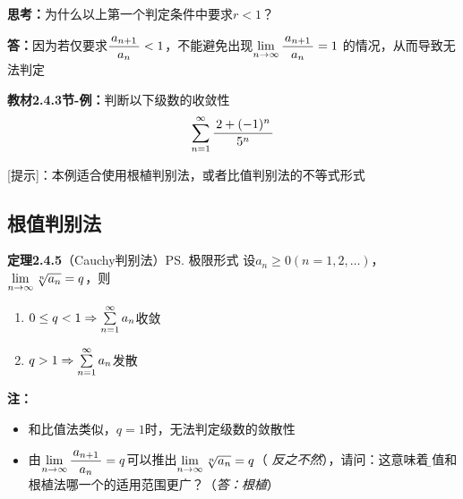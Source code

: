 {\b {\bf 思考：}为什么以上第一个判定条件中要求$r<1$？

{\bf 答：}因为若仅要求$\displaystyle\frac{\,{a_{n+1}}\,}{\,{a_n}\,}<1$，不能避免出现$\lim\limits_{n\to\infty}\displaystyle\frac{\,{a_{n+1}}\,}{\,{a_n}\,}=1$
的情况，从而导致无法判定}

{\bf 教材2.4.3节-例：}判断以下级数的收敛性
$$\sum\limits_{n=1}^{\infty}\displaystyle\frac{\,{2+(-1)^n}\,}{\,{5^n}\,}$$

[提示]：本例适合使用根植判别法，或者比值判别法的不等式形式

% 

\subsection{根值判别法}

{\bf 定理2.4.5}（Cauchy判别法）\ps{极限形式}
设$a_n\geq 0(n=1,2,\ldots)$，$\lim\limits_{n\to\infty}\sqrt[n]{a_n}=q$，则
\begin{enumerate}
  \setlength{\itemindent}{1cm}
  \item $0\leq q<1\Rightarrow\sum\limits_{n=1}^{\infty} a_n$收敛
  \item $q>1\Rightarrow\sum\limits_{n=1}^{\infty} a_n$发散
\end{enumerate}

{\bf 注：}
\begin{itemize}
  \setlength{\itemindent}{1cm}
  \item 和比值法类似，$q=1$时，无法判定级数的敛散性
  \item
  由$\lim\limits_{n\to\infty}\displaystyle\frac{\,{a_{n+1}}\,}{\,{a_n}\,}=q$可以推出$\lim\limits_{n\to\infty}\sqrt[n]{a_n}=q$（
  {\it 反之不然}），请问：这意味着{\b 比值和根植法哪一个的适用范围更广？（{\it 答：根植}）}
\end{itemize}


% 
% 
% 

